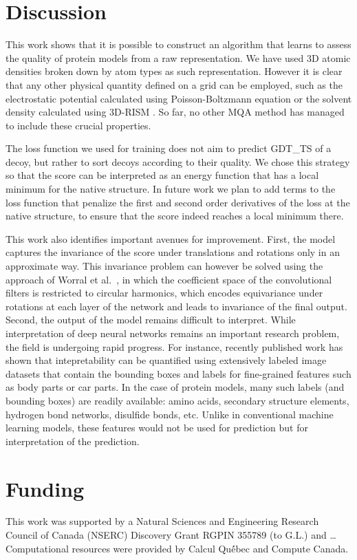 \documentclass{bioinfo}
\begin{document}
\section{Discussion}

This work shows that it is possible to construct an algorithm that
learns to assess the quality of protein models from a raw
representation. We have used 3D atomic densities broken down by atom
types as such representation. However it is clear that any other
physical quantity defined on a grid can be employed, such as the
electrostatic potential calculated using Poisson-Boltzmann equation
\citep{DELPHI???} or the solvent density calculated using 3D-RISM
\citep{REF???}. So far, no other MQA method has managed to include
these crucial properties.

The loss function we used for training does not aim to predict GDT\_TS
of a decoy, but rather to sort decoys according to their quality. We
chose this strategy so that the score can be interpreted as an energy
function that has a local minimum for the native structure. In future
work we plan to add terms to the loss function that penalize the first
and second order derivatives of the loss at the native structure, to
ensure that the score indeed reaches a local minimum there.

This work also identifies important avenues for improvement. First,
the model captures the invariance of the score under translations and
rotations only in an approximate way. This invariance problem can
however be solved using the approach of Worral et
al.\ \citep{worrall2016harmonic}, in which the coefficient space of
the convolutional filters is restricted to circular harmonics, which
encodes equivariance under rotations at each layer of the network and
leads to invariance of the final output.
%
Second, the output of the model remains difficult to interpret. While
interpretation of deep neural networks remains an important research
problem, the field is undergoing rapid progress. For instance,
recently published work \citep{bau2017network} has shown that
intepretability can be quantified using extensively labeled image
datasets that contain the bounding boxes and labels for fine-grained
features such as body parts or car parts. In the case of protein
models, many such labels (and bounding boxes) are readily available:
amino acids, secondary structure elements, hydrogen bond networks,
disulfide bonds, etc. Unlike in conventional machine learning models,
these features would not be used for prediction but for interpretation
of the prediction.

\section*{Funding}
This work was supported by a Natural Sciences and Engineering Research
Council of Canada (NSERC) Discovery Grant RGPIN 355789 (to G.L.) and
\ldots
Computational resources were provided by Calcul Qu{\'e}́bec and
Compute Canada.




\end{document}
